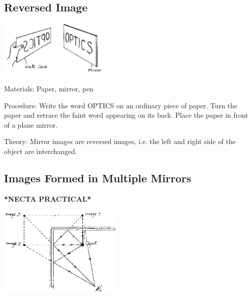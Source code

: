 \begin{multicols}{2}
\vfill
\columnbreak

\subsection{Reversed Image}

\begin{center}
\includegraphics[width=0.4\textwidth]{./img/source/reversed-image-2.jpg}
\end{center}

\begin{description*}
\item[Materials:]{Paper, mirror, pen}
\item[Procedure:]{Write the word OPTICS on an ordinary piece of paper. Turn the paper and retrace the faint word appearing on its back. Place the paper in front of a plane mirror.}
\item[Theory:]{Mirror images are reversed images, i.e. the left and right side of the object are
interchanged.}
\end{description*}

\subsection{Images Formed in Multiple Mirrors} 
\textbf{*NECTA PRACTICAL*}

\begin{center}
\includegraphics[width=0.45\textwidth]{./img/source/multiple-mirrors.png}
\end{center}


\end{multicols}
